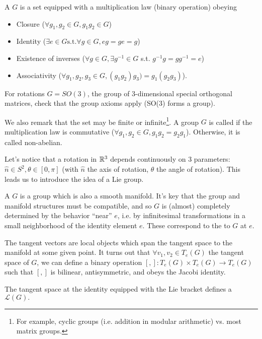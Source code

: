 \begin{defn}
A  $G$ is a set equipped with a multiplication law (binary operation) obeying
\begin{itemize}
    \item Closure ($\forall g_1, g_2\in G, g_1g_2 \in G$)
    \item Identity ($\exists e\in G \text{s.t.} \forall g\in G, eg = ge = g$)
    \item Existence of inverses ($\forall g \in G, \exists g^{-1} \in G$ s.t. $g^{-1}g=gg^{-1}=e$)
    \item Associativity ($\forall g_1,g_2,g_3\in G, (g_1g_2)g_3)=g_1(g_2g_3)$).
\end{itemize}
\end{defn}
\begin{ex}
 For rotations $G=SO(3)$, the group of 3-dimensional special orthogonal matrices, check that the group axioms apply (SO(3) forms a group).
\end{ex}

We also remark that the set may be finite or infinite\footnote{For example, cyclic groups (i.e. addition in modular arithmetic) vs. most matrix groups.}. A group $G$ is called  if the multiplication law is commutative ($\forall g_1,g_2\in G, g_1g_2=g_2g_1$). Otherwise, it is called non-abelian.

Let's notice that a rotation in $\mathbb{R}^3$ depends continuously on 3 parameters: $\hat n\in S^2, \theta \in[0,\pi]$ (with $\hat n$ the axis of rotation, $\theta$ the angle of rotation). This leads us to introduce the idea of a Lie group.
\begin{defn}
A  $G$ is a group which is also a smooth manifold. It's key that the group and manifold structures must be compatible, and so $G$ is (almost) completely determined by the behavior ``near'' $e$, i.e. by infinitesimal transformations in a small neighborhood of the identity element $e$. These correspond to the  to $G$ at $e$.
\end{defn}

The tangent vectors are local objects which span the tangent space to the manifold at some given point. It turns out that $\forall v_1,v_2\in T_e(G)$ the tangent space of $G$, we can define a binary operation $[,]:T_e(G)\times T_e(G) \to T_e(G)$ such that $[,]$ is bilinear, antisymmetric, and obeys the Jacobi identity. 
\begin{defn}
The tangent space at the identity equipped with the Lie bracket defines a  $\mathcal{L}(G).$
\end{defn}

